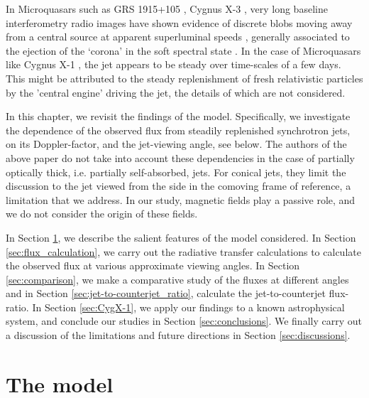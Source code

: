 In Microquasars such as GRS 1915+105 \citep{Fender_et_al.-1999-MNRAS}, Cygnus X-3 \citep{Miller-Jones_et_al.-2004-ApJ}, very long baseline interferometry radio images have shown evidence of discrete blobs moving away from a central source at apparent superluminal speeds \citep{Dhawan_et_al.-2000-ApJ}, generally associated to the ejection of the `corona' in the soft spectral state \citep{Fender_et_al.-2004-MNRAS}. In the case of Microquasars like Cygnus X-1 \citep{Russell_&_Shahbaz-2014-MNRAS}, the jet appears to be steady
over time-scales of a few days. This might be attributed to the steady replenishment of fresh relativistic particles by the 'central engine' driving the jet, the details of which are not considered.

In this chapter, we revisit the findings of the \citealt{Blandford_&_Konigl-1979-ApJ} model. Specifically, we investigate the dependence of the observed flux from steadily replenished synchrotron jets, on its Doppler-factor, and the jet-viewing angle, see below. The authors of the above paper do not take into account these dependencies in the case of partially optically thick, i.e. partially self-absorbed, jets. For conical jets, they limit the discussion to the jet viewed from the side in the comoving frame of reference, a limitation that we address. In our study, magnetic fields play a passive role, and we do not consider the origin of these fields.

In Section \ref{sec:the_model}, we describe the salient features of the model considered. In Section \ref{sec:flux_calculation}, we carry out the radiative transfer calculations to calculate the observed flux at various approximate viewing angles. In Section \ref{sec:comparison}, we make a comparative study of the fluxes at different angles and in Section \ref{sec:jet-to-counterjet_ratio}, calculate the jet-to-counterjet flux-ratio. In Section \ref{sec:CygX-1}, we apply our findings to a known astrophysical system, and conclude our studies in Section \ref{sec:conclusions}. We finally carry out a discussion of the limitations and future directions in Section \ref{sec:discussions}.


\section{The model} \label{sec:the_model}


